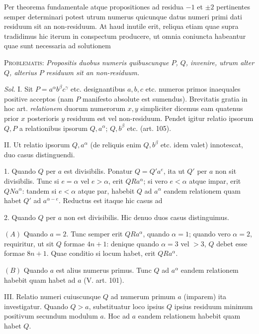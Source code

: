 Per theorema fundamentale atque propositiones ad residua $-1$ et $\pm2$ pertinentes semper determinari potest utrum numerus quicunque datus numeri primi dati residuum sit an non-residuum. At haud inutile erit, reliqua etiam quae supra tradidimus hic iterum in conspectum producere, ut omnia coniuncta habeantur quae sunt necessaria ad solutionem

\textsc{Problematis:} \textit{Propositis duobus numeris quibuscunque $P$, $Q$, invenire, utrum alter $Q$, alterius $P$ residuum sit an non-residuum.}

\textit{Sol.} I. Sit $P=a^{\alpha}b^{\beta}c^{\gamma}$ etc. designantibus $a,b,c$ etc. numeros primos inaequales positive acceptos (nam $P$ manifesto absolute est sumendus). Brevitatis gratia in hoc art. \textit{relationem} duorum numerorum $x,y$ simpliciter dicemus eam quatenus prior $x$ posterioris $y$ residuum est vel non-residuum. Pendet igitur relatio ipsorum $Q,P$ a relationibus ipsorum $Q,a^{\alpha}$; $Q,b^{\beta}$ etc. (art. 105).

II. Ut relatio ipsorum $Q,a^{\alpha}$ (de reliquis enim $Q,b^{\beta}$ etc. idem valet) innotescat, duo casus distinguendi.

1. Quando $Q$ per $a$ est divisibilis. Ponatur $Q=Q'a^e$, ita ut $Q'$ per $a$ non sit divisibilis. Tunc si $e=\alpha$ vel $e>\alpha$, erit $QRa^{\alpha}$; si vero $e<\alpha$ atque impar, erit $QNa^{\alpha}$: tandem si $e<\alpha$ atque par, habebit $Q$ ad $a^{\alpha}$ eandem relationem quam habet $Q'$ ad $a^{\alpha-e}$. Reductus est itaque hic casus ad

2. Quando $Q$ per $a$ non est divisibilis. Hic denuo duos casus distinguimus.

$(A)$ Quando $a=2$. Tunc semper erit $QRa^{\alpha}$, quando $\alpha=1$; quando vero $\alpha=2$, requiritur, ut sit $Q$ formae $4n+1$: denique quando $\alpha=3$ vel $>3$, $Q$ debet esse formae $8n+1$. Quae conditio si locum habet, erit $QRa^{\alpha}$.

$(B)$ Quando $a$ est alius numerus primus. Tunc $Q$ ad $a^{\alpha}$ eandem relationem habebit quam habet ad $a$ (V. art. 101).

III. Relatio numeri cuiuscunque $Q$ ad numerum primum $a$ (imparem) ita investigatur. Quando $Q>a$, substituatur loco ipsius $Q$ ipsius residuum minimum positivum secundum modulum $a$. Hoc ad $a$ eandem relationem habebit quam habet $Q$.

